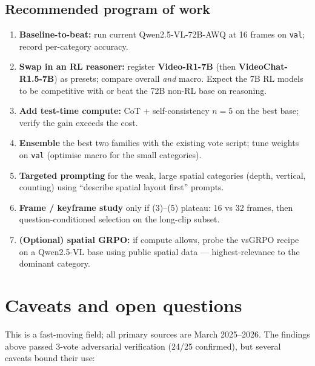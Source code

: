 \documentclass[11pt]{article}
\newcommand{\best}[1]{\textbf{#1}}
\begin{document}
\subsection*{Recommended program of work}
\begin{enumerate}[leftmargin=1.4em,itemsep=2pt]
  \item \textbf{Baseline-to-beat:} run current Qwen2.5-VL-72B-AWQ at 16 frames on
  \texttt{val}; record per-category accuracy.
  \item \textbf{Swap in an RL reasoner:} register \best{Video-R1-7B} (then
  \best{VideoChat-R1.5-7B}) as presets; compare overall \emph{and} macro. Expect
  the 7B RL models to be competitive with or beat the 72B non-RL base on reasoning.
  \item \textbf{Add test-time compute:} CoT $+$ self-consistency $n{=}5$ on the
  best base; verify the gain exceeds the cost.
  \item \textbf{Ensemble} the best two families with the existing vote script; tune
  weights on \texttt{val} (optimise macro for the small categories).
  \item \textbf{Targeted prompting} for the weak, large spatial categories (depth,
  vertical, counting) using ``describe spatial layout first'' prompts.
  \item \textbf{Frame / keyframe study} only if (3)--(5) plateau: 16 vs 32 frames,
  then question-conditioned selection on the long-clip subset.
  \item \textbf{(Optional) spatial GRPO:} if compute allows, probe the vsGRPO
  recipe on a Qwen2.5-VL base using public spatial data --- highest-relevance to
  the dominant category.
\end{enumerate}

\section{Caveats and open questions}
This is a fast-moving field; all primary sources are March 2025--2026. The findings
above passed 3-vote adversarial verification (24/25 confirmed), but several
caveats bound their use:
\end{document}
